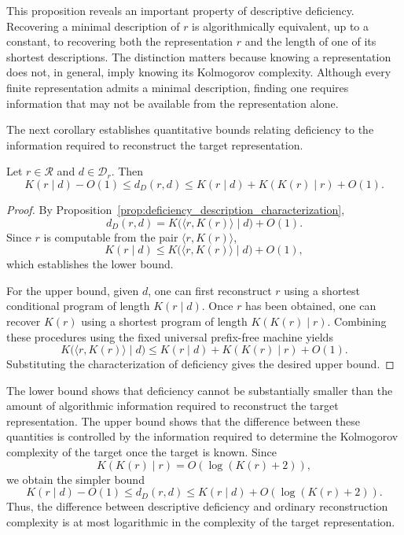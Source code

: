 This proposition reveals an important property of descriptive deficiency. Recovering a minimal description of $r$ is algorithmically equivalent, up to a constant, to recovering both the representation $r$ and the length of one of its shortest descriptions. The distinction matters because knowing a representation does not, in general, imply knowing its Kolmogorov complexity. Although every finite representation admits a minimal description, finding one requires information that may not be available from the representation alone.

The next corollary establishes quantitative bounds relating deficiency to the information required to reconstruct the target representation.

\begin{corollary}
\label{cor:deficiency_description_reconstruction_bounds}
Let $r\in\mathcal R$ and $d\in\mathcal D_r$. Then
\[
K(r\mid d)-O(1) \le d_D(r,d) \le K(r\mid d) + K(K(r)\mid r) + O(1).
\]
\end{corollary}
\begin{proof}
By Proposition~\ref{prop:deficiency_description_characterization},
\[
d_D(r,d) = K\bigl(\langle r,K(r)\rangle\mid d\bigr)+O(1).
\]
Since $r$ is computable from the pair $\langle r,K(r)\rangle$,
\[
K(r\mid d) \le K\bigl(\langle r,K(r)\rangle\mid d\bigr)+O(1),
\]
which establishes the lower bound.

For the upper bound, given $d$, one can first reconstruct $r$ using a shortest conditional program of length $K(r\mid d)$. Once $r$ has been obtained, one can recover $K(r)$ using a shortest program of length $K(K(r)\mid r)$. Combining these procedures using the fixed universal prefix-free machine yields
\[
K\bigl(\langle r,K(r)\rangle\mid d\bigr) \le K(r\mid d)+K(K(r)\mid r)+O(1).
\]
Substituting the characterization of deficiency gives the desired upper bound.
\end{proof}

The lower bound shows that deficiency cannot be substantially smaller than the amount of algorithmic information required to reconstruct the target representation. The upper bound shows that the difference between these quantities is controlled by the information required to determine the Kolmogorov complexity of the target once the target is known. Since
\[
K(K(r)\mid r)=O(\log(K(r)+2)),
\]
we obtain the simpler bound
\[
K(r\mid d)-O(1) \le d_D(r,d) \le K(r\mid d) + O(\log(K(r)+2)).
\]
Thus, the difference between descriptive deficiency and ordinary reconstruction complexity is at most logarithmic in the complexity of the target representation.

